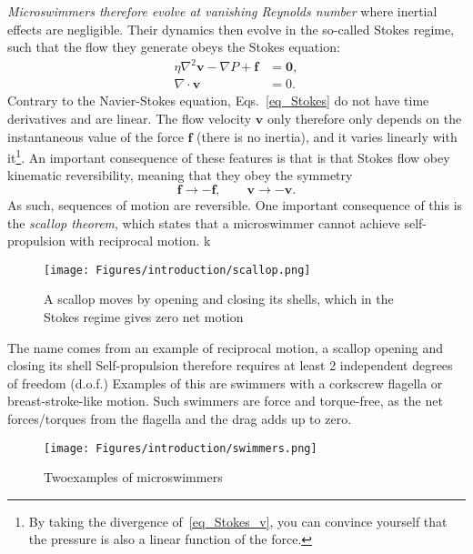 %
%
\textit{Microswimmers therefore evolve at vanishing Reynolds number} where inertial effects are negligible. 
Their dynamics then evolve in the so-called Stokes regime, 
such that the flow they generate obeys the Stokes equation:
%
\begin{subequations}
\label{eq_Stokes}
\begin{align}
    \label{eq_Stokes_v}
    \eta \nabla^2\bm v -\nabla P + \bm f & = \bm 0, \\
    \label{eq_Stokes_inc}
    \nabla \cdot \bm v & = 0.
\end{align}
\end{subequations}
%
Contrary to the Navier-Stokes equation, Eqs.~\eqref{eq_Stokes} do not have time derivatives and are linear.
The flow velocity $\bm v$ only therefore only depends on the instantaneous value of the force $\bm f$ (there is no inertia), and it varies linearly with it\footnote{By taking the divergence of~\eqref{eq_Stokes_v}, you can convince yourself that the pressure is also a linear function of the force.}. 
An important consequence of these features is that is that Stokes flow obey kinematic reversibility, meaning that they obey the symmetry
%
\begin{equation*}
    \bm f \rightarrow -\bm f, \qquad \bm v \rightarrow -\bm v.
\end{equation*}
%
As such, sequences of motion are reversible.
One important consequence of this is the \emph{scallop theorem}, which states that a microswimmer cannot achieve self-propulsion with reciprocal motion.
k 
\begin{figure}[!htb]
    \centering
    \texttt{[image: Figures/introduction/scallop.png]}
    \caption{A scallop moves by opening and closing its shells, which in the Stokes regime gives zero net motion}
    \label{fig: scallop}
\end{figure}

The name comes from an example of reciprocal motion, a scallop opening and closing its shell
Self-propulsion therefore requires at least 2 independent degrees of freedom (d.o.f.)
Examples of this are swimmers with a corkscrew flagella or breast-stroke-like motion.
Such swimmers are force and torque-free, as the net forces/torques from the flagella and the drag adds up to zero.



\begin{figure}[!htb]
    \centering
    \texttt{[image: Figures/introduction/swimmers.png]}
    \caption{Twoexamples of microswimmers}
    \label{fig: swimmers}
\end{figure}



